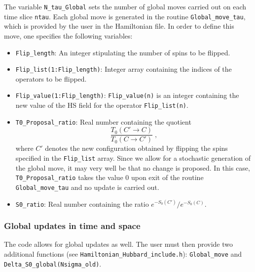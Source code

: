 The variable \texttt{N\_tau\_Global}  sets the number of global moves carried out on each time slice \texttt{ntau}. Each global move is generated in the routine  \texttt{Global\_move\_tau}, which is provided by the user in the Hamiltonian file. In order to  define this move, one specifies the following variables: 
\begin{itemize}
\item \texttt{Flip\_length}:  An integer stipulating the  number of spins to be flipped.
\item \texttt{Flip\_list(1:Flip\_length)}:   Integer array containing the  indices of the operators to be flipped.
\item \texttt{Flip\_value(1:Flip\_length)}:  \texttt{Flip\_value(n)} is an  integer containing the new value of the  HS  field for the operator \texttt{Flip\_list(n)}.
\item  \texttt{T0\_Proposal\_ratio}:   Real number containing  the quotient
\begin{equation}
	 \frac{T_0(C' \rightarrow C)}{T_0(C \rightarrow C') }  \;, \label{T0_ratio}
\end{equation}
where $ C'$  denotes the new configuration  obtained by flipping the spins specified in the \texttt{Flip\_list}  array. 
Since we allow for a stochastic  generation of  the global move, it may very well be that no change is proposed. In this case, \texttt{T0\_Proposal\_ratio}   takes the value 0 upon exit of the routine \texttt{Global\_move\_tau} and  no update is carried out. 
\item \texttt{S0\_ratio}:   Real number containing  the ratio  $e^{-S_0(C')}/e^{-S_0(C)}$. 
\end{itemize}
\subsubsection{Global updates in time and space}
\label{sec:global_slice}
%  
The code allows for global updates as well. The user must then provide two additional functions (see \texttt{Hamiltonian\_Hubbard\_include.h}): \texttt{Global\_move} and \texttt{Delta\_\-S0\_\-global(Nsigma\_old)}.   

